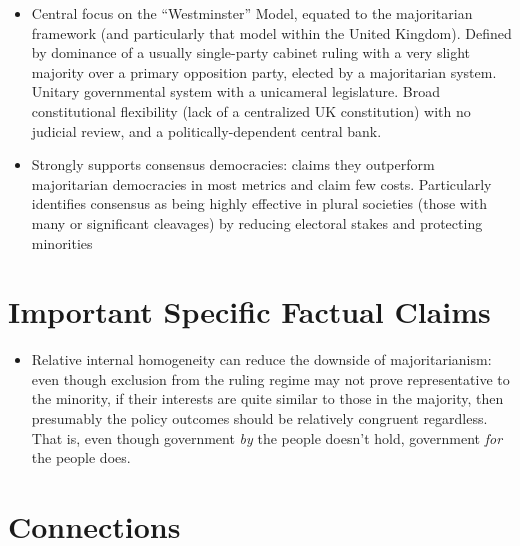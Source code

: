 \documentclass[12pt]{article}
\begin{document}
\begin{itemize}[leftmargin=*, itemsep=4pt]
\begin{itemize}
\begin{enumerate}
        \end{enumerate}
        Primary possible explanation of clustering within these dimensions: Goodin (1996)'s distinction of ``collective agency \& shared responsibility'' with divided agencies and responsibilities
    \end{itemize}
    \item Central focus on the ``Westminster'' Model, equated to the majoritarian framework (and particularly that model within the United Kingdom). Defined by dominance of a usually single-party cabinet ruling with a very slight majority over a primary opposition party, elected by a majoritarian system. Unitary governmental system with a unicameral legislature. Broad constitutional flexibility (lack of a centralized UK constitution) with no judicial review, and a politically-dependent central bank.
    \item Strongly supports consensus democracies: claims they outperform majoritarian democracies in most metrics and claim few costs. Particularly identifies consensus as being highly effective in plural societies (those with many or significant cleavages) by reducing electoral stakes and protecting minorities
\end{itemize}


\section{Important Specific Factual Claims}

\begin{itemize}[leftmargin=*, itemsep=4pt]
    \item Relative internal homogeneity can reduce the downside of majoritarianism: even though exclusion from the ruling regime may not prove representative to the minority, if their interests are quite similar to those in the majority, then presumably the policy outcomes should be relatively congruent regardless. That is, even though government \emph{by} the people doesn't hold, government \emph{for} the people does.
\end{itemize}


\section{Connections}
\end{document}
